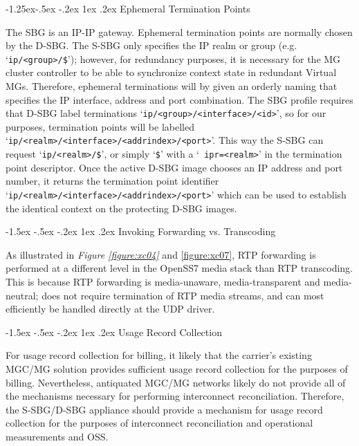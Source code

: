 \documentclass[letterpaper,final,notitlepage,twocolumn,10pt,twoside]{article}
\makeatletter
\let\normalsize = \small
\let\small = \footnotesize
\let\footnotesize = \scriptsize
\let\scriptsize = \tiny
\renewcommand\subsection{\@startsection{subsection}{2}{\z@}%
                                     {-1.5ex \@plus -.5ex \@minus -.2ex}%
                                     {1ex \@plus .2ex}%
                                     {\normalfont\normalsize\bfseries}}
\renewcommand\subsubsection{\@startsection{subsubsection}{3}{\z@}%
                                     {-1.25ex\@plus -.5ex \@minus -.2ex}%
                                     {1ex \@plus .2ex}%
                                     {\normalfont\normalsize\bfseries}}
\makeatother
\begin{document}
\subsubsection{Ephemeral Termination Points}

The SBG is an IP-IP gateway.  Ephemeral termination points are normally chosen
by the D-SBG.  The S-SBG only specifies the IP realm or group (e.g.
`{\tt ip/<group>/\$}'); however, for redundancy purposes, it is necessary for
the MG cluster controller to be able to synchronize context state in redundant
Virtual MGs.  Therefore, ephemeral terminations will by given an orderly
naming that specifies the IP interface, address and port combination.  The SBG
profile requires that D-SBG label terminations
`{\tt ip/<group>/<interface>/<id>}', so for our purposes, termination points
will be labelled `{\tt ip/<realm>/<interface>/<addrindex>/<port>}'.  This way
the S-SBG can request `{\tt ip/<realm>/\$}', or simply `{\tt \$}' with a `{\tt
ipr=<realm>}' in the termination point descriptor.  Once the active D-SBG
image chooses an IP address and port number, it returns the termination point
identifier `{\tt ip/<realm>/<interface>/<addrindex>/<port>}' which can be used
to establish the identical context on the protecting D-SBG images.

\subsection{Invoking Forwarding vs. Transcoding}

As illustrated in {\sl Figure \ref{figure:xc04}} and {\ref{figure:xc07}}, RTP
forwarding is performed at a different level in the OpenSS7 media stack than
RTP transcoding.  This is because RTP forwarding is media-unaware,
media-transparent and media-neutral; does not require termination of RTP
media streams, and can most efficiently be handled directly at the UDP driver.

\subsection{Usage Record Collection}

For usage record collection for billing, it likely that the carrier's existing
MGC/MG solution provides sufficient usage record collection for the purposes of
billing.  Nevertheless, antiquated MGC/MG networks likely do not provide all of
the mechanisms necessary for performing interconnect reconciliation.  Therefore,
the S-SBG/D-SBG appliance should provide a mechanism for usage record collection
for the purposes of interconnect reconciliation and operational measurements and
OSS.
\end{document}
